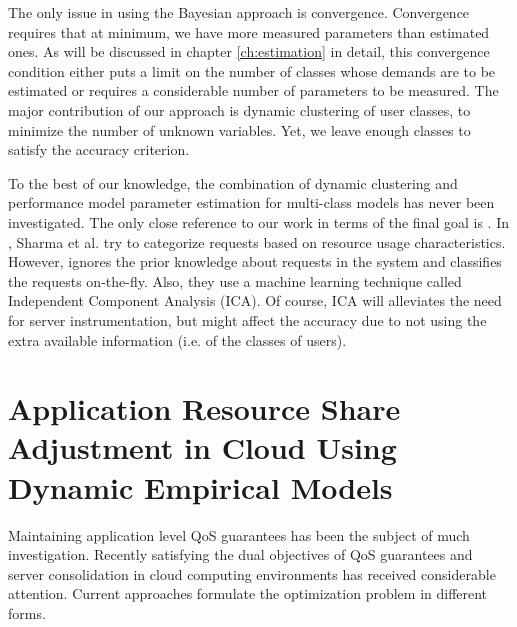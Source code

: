         The only issue in using the Bayesian approach is convergence. Convergence requires that at minimum, we have more measured parameters than estimated ones. As will be discussed in chapter \ref{ch:estimation} in detail, this convergence condition either puts a limit on the number of classes whose demands are to be estimated or requires a considerable number of parameters to be measured. The major contribution of our approach is dynamic clustering of user
  classes, to minimize the number of unknown variables. Yet, we leave enough classes to satisfy the accuracy criterion.  

  To the best of our knowledge, the combination of dynamic clustering and performance model parameter estimation for multi-class models has never been investigated. The only close reference to our work in terms of the final goal is \cite{sharma_automatic_2008}. 
In \cite{sharma_automatic_2008}, Sharma et al. try to categorize requests based on resource usage characteristics. However, \cite{sharma_automatic_2008} ignores the prior knowledge about requests in the system and classifies the requests on-the-fly. Also, they use a machine learning technique called Independent Component Analysis (ICA). Of course, ICA will alleviates the need for server instrumentation, but might affect the accuracy due to not using the extra available information (i.e. of the classes of users).


\section{Application Resource Share Adjustment in Cloud Using Dynamic Empirical Models}      
\label{sec:application_resource_share_optimization_private_cloud}

Maintaining application level QoS  guarantees has been the
subject of much investigation. Recently satisfying the dual objectives of
QoS guarantees and server consolidation in cloud computing environments has
received considerable attention. Current approaches formulate the optimization
problem in different forms.

